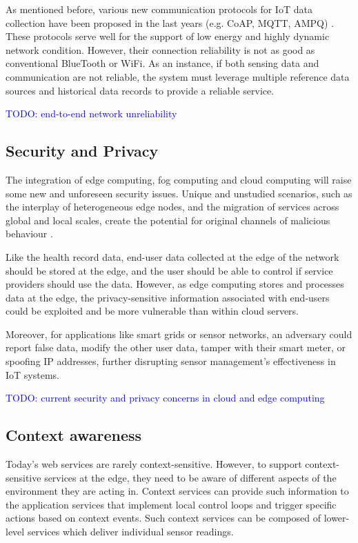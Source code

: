 As mentioned before, various new communication protocols for IoT data collection have been proposed in the last years (e.g. CoAP, MQTT, AMPQ) \cite{mqtt-coap-amqp-http}. These protocols serve well for the support of low energy and highly dynamic network condition. However, their connection reliability is not as good as conventional BlueTooth or WiFi. As an instance, if both sensing data and communication are not reliable, the system must leverage multiple reference data sources and historical data records to provide a reliable service.

\textcolor{blue}{TODO: end-to-end network unreliability}

\subsection{Security and Privacy}

The integration of edge computing, fog computing and cloud computing will raise some new and unforeseen security issues. Unique and unstudied scenarios, such as the interplay of heterogeneous edge nodes, and the migration of services across global and local scales, create the potential for original channels of malicious behaviour \cite{edge-computing-survey}.

Like the health record data, end-user data collected at the edge of the network should be stored at the edge, and the user should be able to control if service providers should use the data. However, as edge computing stores and processes data at the edge, the privacy-sensitive information associated with end-users could be exploited and be more vulnerable than within cloud servers.

Moreover, for applications like smart grids or sensor networks, an adversary could report false data, modify the other user data, tamper with their smart meter, or spoofing IP addresses, further disrupting sensor management's effectiveness in IoT systems.

\textcolor{blue}{TODO: current security and privacy concerns in cloud and edge computing}

\subsection{Context awareness}

Today's web services are rarely context-sensitive. However, to support context-sensitive services at the edge, they need to be aware of different aspects of the environment they are acting in. Context services can provide such information to the application services that implement local control loops and trigger specific actions based on context events. Such context services can be composed of lower-level services which deliver individual sensor readings.

